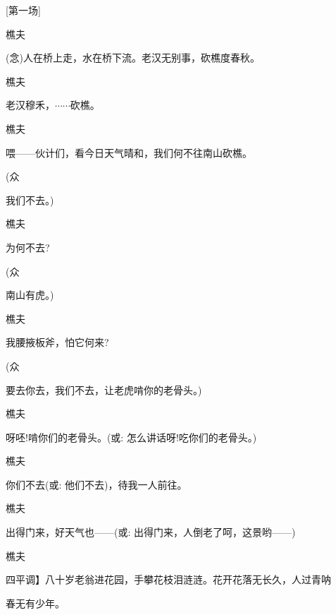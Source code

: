 \newpage

\hypertarget{ux6253ux68cdux51faux7bb1}{%

}

{{[}第一场{]}}

{樵夫}\hspace{30pt}~

({\akai 念})人在桥上走，水在桥下流。老汉无别事，砍樵度春秋。

樵夫\hspace{30pt}~

老汉穆禾，{$\cdots{}\cdots{}$}砍樵。

樵夫\hspace{30pt}~

喂------伙计们，看今日天气晴和，我们何不往南山砍樵。

{(众\hspace{40pt}~

我们不去。)}

{樵夫\hspace{30pt}~

为何不去?}

{(众\hspace{40pt}~

南山有虎。)}

{樵夫\hspace{30pt}~

我腰掖板斧，怕它何来?}

{(众\hspace{40pt}~

要去你去，我们不去，让老虎啃你的老骨头。)}

{樵夫\hspace{30pt}~

呀呸!啃你们的老骨头。({\akai 或}: 怎么讲话呀!吃你们的老骨头。)}

{樵夫\hspace{30pt}~

你们不去({\akai 或}: 他们不去)，待我一人前往。}

{樵夫

出得门来，好天气也------({\akai 或}: 出得门来，人倒老了呵，这景哟------)}

{樵夫

四平调{】八十岁老翁进花园，手攀花枝泪涟涟。花开花落无长久，人过青呐 }

春无有少年。}

